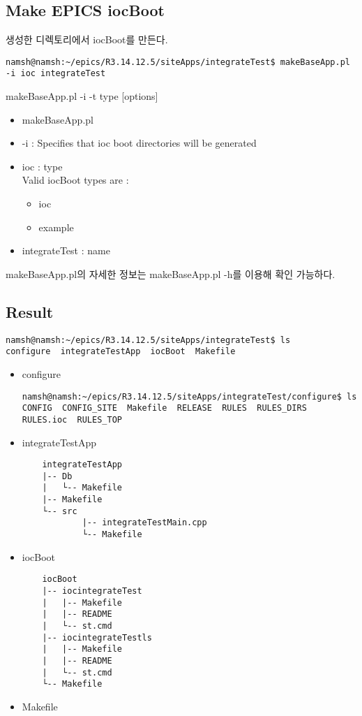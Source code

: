 \documentclass[11pt
  , a4paper
  , article
  , oneside
]{memoir}
\begin{document}
\subsection{Make EPICS iocBoot}
생성한 디렉토리에서 iocBoot를 만든다.
\begin{lstlisting}[style=termstyle]
namsh@namsh:~/epics/R3.14.12.5/siteApps/integrateTest$ makeBaseApp.pl -i ioc integrateTest
\end{lstlisting}
makeBaseApp.pl -i -t type [options]
\begin{itemize}
\item makeBaseApp.pl
\item -i : Specifies that ioc boot directories will be generated
\item ioc : type
\\Valid iocBoot types are :
\begin{itemize}
	\item ioc
	\item example
\end{itemize}
\item integrateTest : name
\end{itemize}
makeBaseApp.pl의 자세한 정보는 makeBaseApp.pl -h를 이용해 확인 가능하다.
\subsection{Result}
\begin{lstlisting}[style=termstyle]
namsh@namsh:~/epics/R3.14.12.5/siteApps/integrateTest$ ls
configure  integrateTestApp  iocBoot  Makefile
\end{lstlisting}
\begin{itemize}
	\item configure
	\begin{lstlisting}[style=termstyle]
namsh@namsh:~/epics/R3.14.12.5/siteApps/integrateTest/configure$ ls
CONFIG  CONFIG_SITE  Makefile  RELEASE  RULES  RULES_DIRS  RULES.ioc  RULES_TOP
\end{lstlisting}
    \item integrateTestApp
        \begin{verbatim}
    integrateTestApp
    |-- Db
    |   └-- Makefile
    |-- Makefile
    └-- src
            |-- integrateTestMain.cpp
            └-- Makefile
        \end{verbatim}
        \item iocBoot
                \begin{verbatim}
    iocBoot
    |-- iocintegrateTest
    |   |-- Makefile
    |   |-- README
    |   └-- st.cmd
    |-- iocintegrateTestls
    |   |-- Makefile
    |   |-- README
    |   └-- st.cmd
    └-- Makefile
             \end{verbatim}
             \item Makefile
        \end{itemize}
\clearpage
\end{document}
